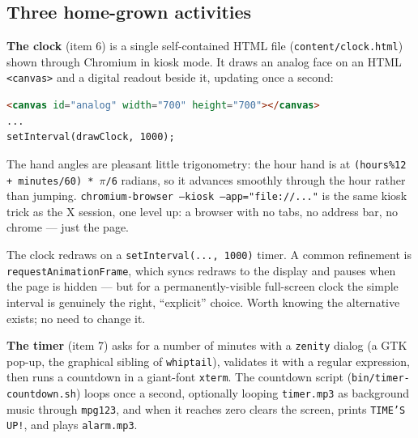 \documentclass[11pt,oneside]{article}
\newcommand{\code}[1]{\texorpdfstring{\textcolor{kbblue}{\texttt{#1}}}{#1}}
\newcommand{\file}[1]{\textcolor{kbteal}{\texttt{#1}}}
\begin{document}
\subsection{Three home-grown activities}

\textbf{The clock} (item 6) is a single self-contained HTML file
(\file{content/clock.html}) shown through Chromium in kiosk mode. It draws an
analog face on an HTML \code{<canvas>} and a digital readout beside it, updating
once a second:

\begin{lstlisting}[language=html]
<canvas id="analog" width="700" height="700"></canvas>
...
setInterval(drawClock, 1000);
\end{lstlisting}

The hand angles are pleasant little trigonometry: the hour hand is at
\code{(hours\%12 + minutes/60) * \(\pi\)/6} radians, so it advances smoothly
through the hour rather than jumping. \code{chromium-browser --kiosk
--app="file://..."} is the same kiosk trick as the X session, one level up: a
browser with no tabs, no address bar, no chrome --- just the page.

\begin{fieldnote}
The clock redraws on a \code{setInterval(..., 1000)} timer. A common refinement
is \code{requestAnimationFrame}, which syncs redraws to the display and pauses
when the page is hidden --- but for a permanently-visible full-screen clock the
simple interval is genuinely the right, ``explicit'' choice. Worth knowing the
alternative exists; no need to change it.
\end{fieldnote}

\textbf{The timer} (item 7) asks for a number of minutes with a \texttt{zenity}
dialog (a GTK pop-up, the graphical sibling of \texttt{whiptail}), validates it
with a regular expression, then runs a countdown in a giant-font \texttt{xterm}.
The countdown script (\file{bin/timer-countdown.sh}) loops once a second,
optionally looping \file{timer.mp3} as background music through \texttt{mpg123},
and when it reaches zero clears the screen, prints \code{TIME'S UP!}, and plays
\file{alarm.mp3}.
\end{document}
